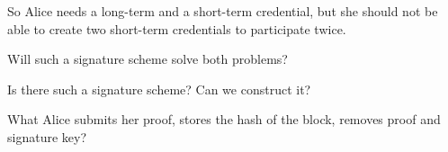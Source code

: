 So Alice needs a long-term and a short-term credential, but she should not be 
able to create two short-term credentials to participate twice.

\begin{frame}
  \begin{question}
    Will such a signature scheme solve both problems?
  \end{question}
  \begin{question}
    Is there such a signature scheme?
    Can we construct it?
  \end{question}
  \begin{question}
    What Alice submits her proof, stores the hash of the block, removes proof 
    and signature key?
  \end{question}
\end{frame}


